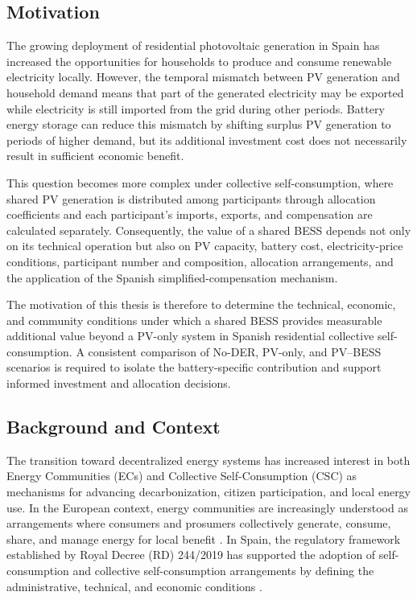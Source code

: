 

\subsection{Motivation}
\label{subsec:motivation}

The growing deployment of residential photovoltaic generation in Spain
has increased the opportunities for households to produce and consume
renewable electricity locally. However, the temporal mismatch between PV
generation and household demand means that part of the generated
electricity may be exported while electricity is still imported from the
grid during other periods. Battery energy storage can reduce this
mismatch by shifting surplus PV generation to periods of higher demand,
but its additional investment cost does not necessarily result in
sufficient economic benefit.

This question becomes more complex under collective self-consumption,
where shared PV generation is distributed among participants through
allocation coefficients and each participant's imports, exports, and
compensation are calculated separately. Consequently, the value of a
shared BESS depends not only on its technical operation but also on PV
capacity, battery cost, electricity-price conditions, participant number
and composition, allocation arrangements, and the application of the
Spanish simplified-compensation mechanism.

The motivation of this thesis is therefore to determine the technical,
economic, and community conditions under which a shared BESS provides
measurable additional value beyond a PV-only system in Spanish
residential collective self-consumption. A consistent comparison of
No-DER, PV-only, and PV--BESS scenarios is required to isolate the
battery-specific contribution and support informed investment and
allocation decisions.

\subsection{Background and Context}\label{background-and-context}

The transition toward decentralized energy systems has increased interest
in both Energy Communities (ECs) and Collective Self-Consumption (CSC) as
mechanisms for advancing decarbonization, citizen participation, and local
energy use. In the European context, energy communities
are increasingly understood as arrangements where consumers and
prosumers collectively generate, consume, share, and manage energy for
local benefit \cite{ch1ref001}. In Spain, the regulatory framework established by
Royal Decree (RD) 244/2019 has supported the adoption of
self-consumption and collective self-consumption arrangements by
defining the administrative, technical, and economic conditions \cite{ch1ref002}.

